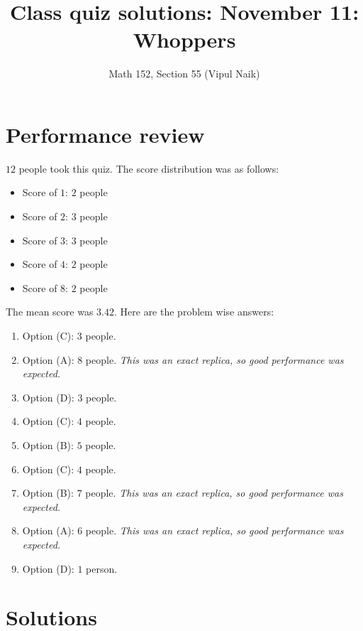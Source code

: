 \documentclass[10pt]{amsart}
\title{Class quiz solutions: November 11: Whoppers}
\author{Math 152, Section 55 (Vipul Naik)}
\begin{document}
\maketitle

\section{Performance review}

$12$ people took this quiz. The score distribution was as follows:

\begin{itemize}
\item Score of $1$: $2$ people
\item Score of $2$: $3$ people
\item Score of $3$: $3$ people
\item Score of $4$: $2$ people
\item Score of $8$: $2$ people
\end{itemize}

The mean score was $3.42$. Here are the problem wise answers:

\begin{enumerate}
\item Option (C): $3$ people.
\item Option (A): $8$ people. {\em This was an exact replica, so good performance was expected.}
\item Option (D): $3$ people.
\item Option (C): $4$ people.
\item Option (B): $5$ people.
\item Option (C): $4$ people.
\item Option (B): $7$ people. {\em This was an exact replica, so good
  performance was expected.}
\item Option (A): $6$ people. {\em This was an exact replica, so good
  performance was expected.}
\item Option (D): $1$ person.
\end{enumerate}
\section{Solutions}
\end{document}
